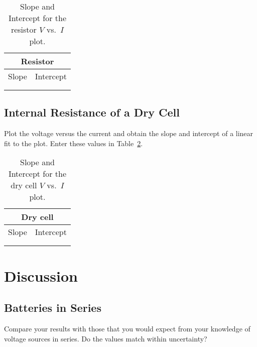 \begin{table}[htb]
\begin{center}
\begin{tabular}{|c|c|}
\hline
\multicolumn{2}{|c|}{Resistor} \\
\hline
Slope & Intercept \\
\hline
\hspace*{5cm} & \hspace*{5cm} \\
& \\
\hline
\end{tabular}
\end{center}
\caption{Slope and Intercept for the resistor $V$ vs.\ $I$ plot.}
\label{tab:DC:slopeinter}
\end{table}

\subsection{Internal Resistance of a Dry Cell}
Plot the voltage versus the current and obtain the slope and intercept of a
linear fit to the plot.  Enter these values in Table~\ref{tab:DC:battslope}.

\begin{table}[htb]
\begin{center}
\begin{tabular}{|c|c|}
\hline
\multicolumn{2}{|c|}{Dry cell} \\
\hline
Slope & Intercept \\
\hline
\hspace*{5cm} & \hspace*{5cm} \\
& \\
\hline
\end{tabular}
\end{center}
\caption{Slope and Intercept for the dry cell $V$ vs.\ $I$ plot.}
\label{tab:DC:battslope}
\end{table}

\newpage

\section{Discussion}
\subsection{Batteries in Series}
Compare your results with those that you would expect from your knowledge of 
voltage sources in series.  Do the values match within uncertainty? \\

